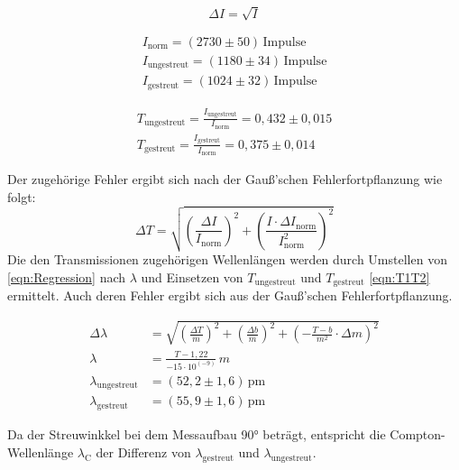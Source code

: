 \documentclass[titlepage = firstcover]{scrartcl}
\begin{document}
        \begin{equation*}
            \Delta I = \sqrt{I}
        \end{equation*}

        \begin{align*}
            I_{\text{norm}} = (2730 \pm 50) \, \text{Impulse}\\
            I_{\text{ungestreut}} = (1180 \pm 34) \, \text{Impulse}\\
            I_{\text{gestreut}} = (1024 \pm 32) \, \text{Impulse}
        \end{align*}
        
        \begin{align}
            T_{\text{ungestreut}} = \frac{I_{\text{ungestreut}}}{I_{\text{norm}}}=0,432 \pm 0,015 \nonumber\\
            T_{\text{gestreut}} = \frac{I_{\text{gestreut}}}{I_{\text{norm}}}=0,375 \pm 0,014 
            \label{eqn:T1T2}
        \end{align}

        \noindent
        Der zugehörige Fehler ergibt sich nach der Gauß'schen Fehlerfortpflanzung wie folgt:     
        \begin{equation*}
            \Delta T = \sqrt{\left( \frac{\Delta I}{I_{\text{norm}}}\right)^2 + \left(\frac{I \cdot \Delta I_{\text{norm}}}{I_{\text{norm}}^2}\right)^2}
        \end{equation*}
        \noindent
        Die den Transmissionen zugehörigen Wellenlängen werden durch Umstellen von \ref{eqn:Regression} nach $\lambda$ und Einsetzen von $T_{\text{ungestreut}}$
        und $T_{\text{gestreut}}$ \ref{eqn:T1T2} ermittelt. Auch deren Fehler ergibt sich aus der Gauß'schen Fehlerfortpflanzung.

        \begin{align}
            \Delta \lambda &= \sqrt{\left(\frac{\Delta T}{m}\right)^2 + \left(\frac{\Delta b}{m}\right)^2 + \left(-\frac{T-b}{m^2} \cdot \Delta m\right)^2} \nonumber \\
            \lambda &= \frac{T - 1,22}{-15\cdot 10^{\left(-9\right)}} \, m \\
            \lambda_{\text{ungestreut}} &= (52,2 \pm 1,6) \, \text{pm} \nonumber \\
            \lambda_{\text{gestreut}} &= (55,9 \pm 1,6)  \, \text{pm} \nonumber
            \label{eqn:y1,y2}
        \end{align}

        \noindent
        Da der Streuwinkkel bei dem Messaufbau 90° beträgt, entspricht die Compton-Wellenlänge $\lambda_{\text{C}}$ der Differenz von $\lambda_{\text{gestreut}}$
        und $\lambda_{\text{ungestreut}}$.
        
\end{document}

